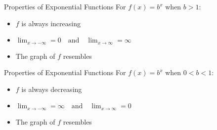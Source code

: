 \documentclass[t,usenames,dvipsnames]{beamer}
\begin{document}
\begin{frame}{Properties of Exponential Functions}
For $f(x) = b^x$ when $b > 1$:  \newline\\
\begin{itemize}
    \item $f$ is always increasing  \newline\\  \pause
    \item $\lim_{x\to -\infty} = 0 \quad \text{and} \quad \lim_{x\to \infty} = \infty$ \newline\\ \pause
    \item The graph of $f$ resembles
\end{itemize}
\begin{center}
\end{center}
\end{frame}

\begin{frame}{Properties of Exponential Functions}
For $f(x) = b^x$ when $0 < b < 1$:  \newline\\
\begin{itemize}
    \item $f$ is always decreasing  \newline\\  \pause
    \item $\lim_{x\to -\infty} = \infty \quad \text{and} \quad \lim_{x\to \infty} = 0$ \newline\\ \pause
    \item The graph of $f$ resembles
\end{itemize}
\begin{center}
\end{center}
\end{frame}
\end{document}
